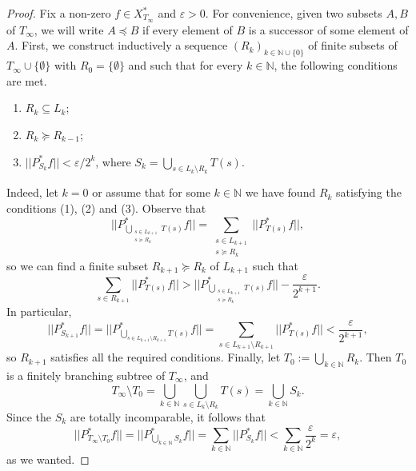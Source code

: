 \documentclass[11pt,a4paper,reqno]{amsart}
\numberwithin{equation}{section}
\newcommand{\N}{\mathbb{N}}
\newcommand{\1}{\mathbbm{1}}
\theoremstyle{plain}
\theoremstyle{definition}
\begin{document}
\begin{proof}
 Fix a non-zero $f\in X_{T_\infty}^*$ and $\varepsilon>0$. For convenience, given two subsets $A,B$ of $T_\infty$, we will write $A\preceq B$ if every element of $B$ is a successor of some element of $A$.  First, we construct inductively a sequence $(R_k)_{k\in \N\cup\{0\}}$ of finite subsets of $T_\infty\cup\{\emptyset\}$ with $R_0=\{\emptyset\}$ and such that for every $k\in\mathbb{N}$, the following conditions are met.
    \begin{enumerate}
        \item $R_k\subseteq L_k$;
        \item $R_k\succeq R_{k-1}$;
        \item $||P^*_{S_k}f||<\varepsilon/2^k$, where $S_k = \bigcup_{s\in L_k\setminus R_k}T(s)$.
    \end{enumerate} Indeed, let $k=0$ or assume that for some $k\in\N$ we have found $R_k$ satisfying the conditions (1), (2) and (3). Observe that \begin{equation*}
        ||P^*_{\bigcup_{\substack{s\in L_{k+1}\\
    s\succeq R_k}}T(s)}f|| = \sum_{\substack{s\in L_{k+1}\\ s\succeq R_k}} ||P^*_{T(s)}f||,
    \end{equation*}
    so we can find a finite subset $R_{k+1}\succeq R_k$ of $L_{k+1}$ such that\begin{equation*}
        \sum_{s\in R_{k+1}}||P^*_{T(s)}f|| >  ||P^*_{\bigcup_{\substack{s\in L_{k+1}\\ s \succeq R_{k}}}T(s)}f||- \frac{\varepsilon}{2^{k+1}}.
    \end{equation*}
    In particular, \begin{equation*}
        ||P^*_{S_{k+1}}f|| = ||P^*_{\bigcup_{s\in L_{k+1}\setminus R_{k+1}}T(s)}f|| = \sum_{s\in L_{k+1}\setminus R_{k+1}}||P^*_{T(s)}f||<\frac{\varepsilon}{2^{k+1}},
    \end{equation*} so $R_{k+1}$ satisfies all the required conditions. Finally, let $T_0:= \bigcup_{k\in\mathbb{N}} R_k$. Then $T_0$ is a finitely branching subtree of $T_\infty$, and 
\begin{equation*}
    T_{\infty}\setminus T_0 = \bigcup_{k\in\mathbb{N}}\bigcup_{s\in L_k\setminus R_k} T(s) = \bigcup_{k\in\mathbb{N}}S_k.
\end{equation*} Since the $S_k$ are totally incomparable, it follows that \begin{equation*}
     || P^*_{T_{\infty}\setminus T_0}f|| = ||P^*_{\bigcup_{k\in\mathbb{N}}S_k}f|| = \sum_{k\in\mathbb{N}}||P^*_{S_k}f|| < \sum_{k\in\mathbb{N}}\frac{\varepsilon}{2^k}=\varepsilon,
\end{equation*} as we wanted.
\end{proof}
\end{document}
